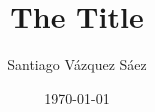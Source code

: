 \documentclass[twoside]{article}
\begin{document}
\title{The Title}
\author{Santiago Vázquez Sáez}
\date{\today}
\maketitle



\end{document}
